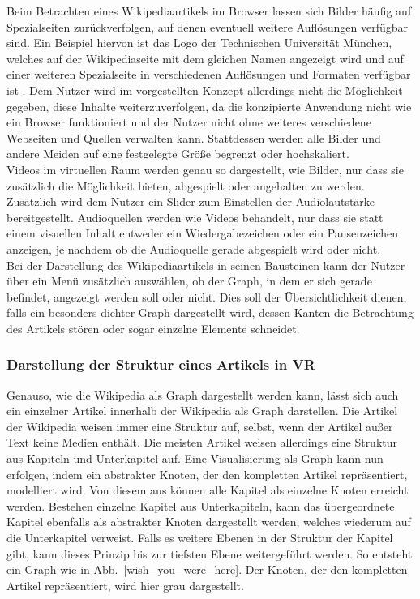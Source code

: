 \documentclass[12pt, a4paper]{article}
\begin{document}
Beim Betrachten eines Wikipediaartikels im Browser lassen sich Bilder häufig auf Spezialseiten zurückverfolgen, auf denen eventuell weitere Auflösungen verfügbar sind. Ein Beispiel hiervon ist das Logo der Technischen Universität München, welches auf der Wikipediaseite mit dem gleichen Namen angezeigt wird und auf einer weiteren Spezialseite in verschiedenen Auflösungen und Formaten verfügbar ist \cite{wiki:TUMlogo}. Dem Nutzer wird im vorgestellten Konzept allerdings nicht die Möglichkeit gegeben, diese Inhalte weiterzuverfolgen, da die konzipierte Anwendung nicht wie ein Browser funktioniert und der Nutzer nicht ohne weiteres verschiedene Webseiten und Quellen verwalten kann. Stattdessen werden alle Bilder und andere Meiden auf eine festgelegte Größe begrenzt oder hochskaliert.\\

Videos im virtuellen Raum werden genau so dargestellt, wie Bilder, nur dass sie zusätzlich die Möglichkeit bieten, abgespielt oder angehalten zu werden. Zusätzlich wird dem Nutzer ein Slider zum Einstellen der Audiolautstärke bereitgestellt. Audioquellen werden wie Videos behandelt, nur dass sie statt einem visuellen Inhalt entweder ein Wiedergabezeichen oder ein Pausenzeichen anzeigen, je nachdem ob die Audioquelle gerade abgespielt wird oder nicht.\\

Bei der Darstellung des Wikipediaartikels in seinen Bausteinen kann der Nutzer über ein Menü zusätzlich auswählen, ob der Graph, in dem er sich gerade befindet, angezeigt werden soll oder nicht. Dies soll der Übersichtlichkeit dienen, falls ein besonders dichter Graph dargestellt wird, dessen Kanten die Betrachtung des Artikels stören oder sogar einzelne Elemente schneidet.\\

\subsubsection{Darstellung der Struktur eines Artikels in VR}

Genauso, wie die Wikipedia als Graph dargestellt werden kann, lässt sich auch ein einzelner Artikel innerhalb der Wikipedia als Graph darstellen. Die Artikel der Wikipedia weisen immer eine Struktur auf, selbst, wenn der Artikel außer Text keine Medien enthält. Die meisten Artikel weisen allerdings eine Struktur aus Kapiteln und Unterkapitel auf.  Eine Visualisierung als Graph kann nun erfolgen, indem ein abstrakter Knoten, der den kompletten Artikel repräsentiert, modelliert wird. Von diesem aus können alle Kapitel als einzelne Knoten erreicht werden. Bestehen einzelne Kapitel aus Unterkapiteln, kann das übergeordnete Kapitel ebenfalls als abstrakter Knoten dargestellt werden, welches wiederum auf die Unterkapitel verweist. Falls es weitere Ebenen in der Struktur der Kapitel gibt, kann dieses Prinzip bis zur tiefsten Ebene weitergeführt werden. So entsteht ein Graph wie in Abb.~\ref{wish_you_were_here}. Der Knoten, der den kompletten Artikel repräsentiert, wird hier grau dargestellt.\\
\end{document}
